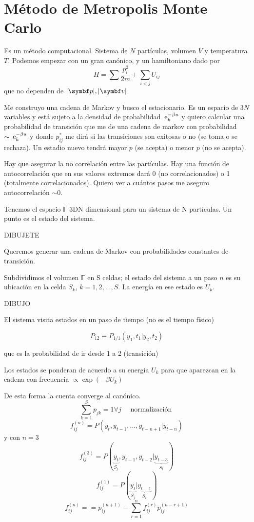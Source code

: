 \documentclass[10pt,oneside]{CBFT_book}
\begin{document}
\section{Método de Metropolis Monte Carlo}

Es un método computacional. Sistema de $N$ partículas, volumen $V$ y temperatura $T$.
Podemos empezar con un gran canónico, y un hamiltoniano dado por
\[
	H = \sum \frac{p^2_i}{2m} + \sum_{i<j} U_{ij}
\]
que no dependen de $|\vbp|, |\vbv|$.

Me construyo una cadena de Markov y busco el estacionario. Es un espacio de $3N$ variables y
está sujeto a la densidad de probabilidad $ \:\mathrm{e}^{-\beta u}_k$ y quiero calcular una
probabilidad de transición que me de una cadena de markov con probabilidad $\sim \:\mathrm{e}^{-\beta u}_k $
y donde $p_{ij}^*$ me dirá si las transiciones son exitosas o no (se toma o se rechaza).
Un estadio nuevo tendrá mayor $p$ (se acepta) o menor $p$ (no se acepta).

Hay que asegurar la no correlación entre las partículas. Hay una función de autocorrelación
que en sus valores extremos dará 0 (no correlacionados) o 1 (totalmente correlacionados).
Quiero ver a cuántos pasos me aseguro autocorrelación $\sim 0$.


Tenemos el espacio $ \mathbb{\Gamma} $ 3DN dimensional para un sistema de N partículas.
Un punto es el estado del sistema.

DIBUJETE

Queremos generar una cadena de Markov con probabilidades constantes de transición.

Subdividimos el volumen $ \mathbb{\Gamma} $  en S celdas; el estado del sistema a un paso $n$ es su
ubicación en la celda $S_k$, $k=1,2,...,S$. La energía en ese estado es $U_k$.

DIBUJO 

El sistema visita estados en un paso de tiempo (no es el tiempo físico)

\[
	P_{12} \equiv P_{1/1}( y_1, t_1 | y_2, t_2 )
\]

que es la probabilidad de ir desde 1 a 2 (transición)

Los estados se ponderan de acuerdo a su energía $U_k$ para que aparezcan en la cadena con frecuencia
$ \propto \exp(-\beta U_k ) $

De esta forma la cuenta converge al canónico.
\[
	\sum_{k=1}^S p_{jk} = 1 \forall j \quad \text{ normalización }
\]
\[
	f_{ij}^{(n)} = P( y_t, y_{t-1}, ..., y_{t-n+1} | y_{t-n} )
\]
y con $n=3$
\[
	f_{ij}^{(3)} = P( \underbrace{y_t}_{S_j}, y_{t-1}, y_{t-2} | \underbrace{y_{t-3}}_{S_i} )
\]
\[
	f_{ij}^{(1)} = P( \underbrace{y_t}_{S_j} | \underbrace{y_{t-1}}_{S_i} )
\]
\[
	f_{ij}^{(n)} = = p_{ij}^{(n+1)} - \sum_{r=1}^n f_{ij}^{(r)} p_{ij}^{(n-r+1)}
\]
\end{document}
